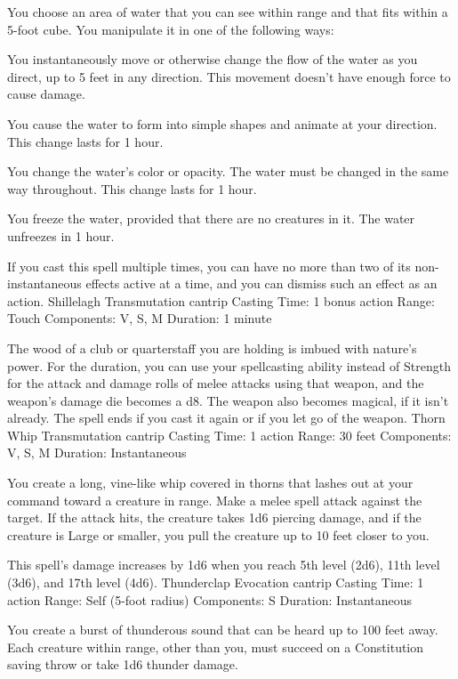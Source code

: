\documentclass[10pt,twoside,twocolumn]{book}
\begin{document}
You choose an area of water that you can see within range and that fits within a 5-foot cube. You manipulate it in one of the following ways:

    You instantaneously move or otherwise change the flow of the water as you direct, up to 5 feet in any direction. This movement doesn't have enough force to cause damage.

    You cause the water to form into simple shapes and animate at your direction. This change lasts for 1 hour.

    You change the water's color or opacity. The water must be changed in the same way throughout. This change lasts for 1 hour.

    You freeze the water, provided that there are no creatures in it. The water unfreezes in 1 hour.

If you cast this spell multiple times, you can have no more than two of its non-instantaneous effects active at a time, and you can dismiss such an effect as an action.
Shillelagh
Transmutation cantrip
Casting Time: 1 bonus action
Range: Touch
Components: V, S, M
Duration: 1 minute

The wood of a club or quarterstaff you are holding is imbued with nature's power. For the duration, you can use your spellcasting ability instead of Strength for the attack and damage rolls of melee attacks using that weapon, and the weapon's damage die becomes a d8. The weapon also becomes magical, if it isn't already. The spell ends if you cast it again or if you let go of the weapon.
Thorn Whip
Transmutation cantrip
Casting Time: 1 action
Range: 30 feet
Components: V, S, M
Duration: Instantaneous

You create a long, vine-like whip covered in thorns that lashes out at your command toward a creature in range. Make a melee spell attack against the target. If the attack hits, the creature takes 1d6 piercing damage, and if the creature is Large or smaller, you pull the creature up to 10 feet closer to you.

This spell’s damage increases by 1d6 when you reach 5th level (2d6), 11th level (3d6), and 17th level (4d6).
Thunderclap
Evocation cantrip
Casting Time: 1 action
Range: Self (5-foot radius)
Components: S
Duration: Instantaneous

You create a burst of thunderous sound that can be heard up to 100 feet away. Each creature within range, other than you, must succeed on a Constitution saving throw or take 1d6 thunder damage.
\end{document}
